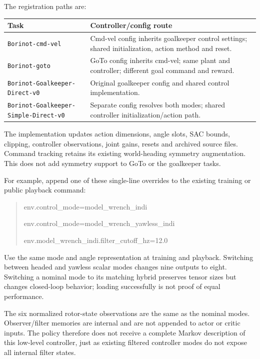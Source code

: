 \documentclass[11pt,a4paper]{article}
\begin{document}
The registration paths are:
\begin{center}\small
\begin{tabular}{L{6.1cm}L{8.2cm}}
\toprule Task & Controller/config route\\\midrule
\texttt{Borinot-cmd-vel} & Cmd-vel config inherits goalkeeper control settings; shared initialization, action method and reset.\\
\texttt{Borinot-goto} & GoTo config inherits cmd-vel; same plant and controller; different goal command and reward.\\
\texttt{Borinot-Goalkeeper-Direct-v0} & Original goalkeeper config and shared control implementation.\\
\texttt{Borinot-Goalkeeper-}\newline\texttt{Simple-Direct-v0} & Separate config resolves both modes; shared controller initialization/action path.\\\bottomrule
\end{tabular}
\end{center}
The implementation updates action dimensions, angle slots, SAC bounds, clipping,
controller observations, joint gains, resets and archived source files. Command
tracking retains its existing world-heading symmetry augmentation. This does not
add symmetry support to GoTo or the goalkeeper tasks.

For example, append one of these single-line overrides to the existing training
or public playback command:
\begin{quote}\ttfamily\small
 env.control\_mode=model\_wrench\_indi\par
 env.control\_mode=model\_wrench\_yawless\_indi\par
 env.model\_wrench\_indi.filter\_cutoff\_hz=12.0
\end{quote}
Use the same mode and angle representation at training and playback. Switching
between headed and yawless scalar modes changes nine outputs to eight. Switching
a nominal mode to its matching hybrid preserves tensor sizes but changes
closed-loop behavior; loading successfully is not proof of equal performance.

The six normalized rotor-state observations are the same as the nominal modes.
Observer/filter memories are internal and are not appended to actor or critic
inputs. The policy therefore does not receive a complete Markov description of
this low-level controller, just as existing filtered controller modes do not
expose all internal filter states.
\end{document}
